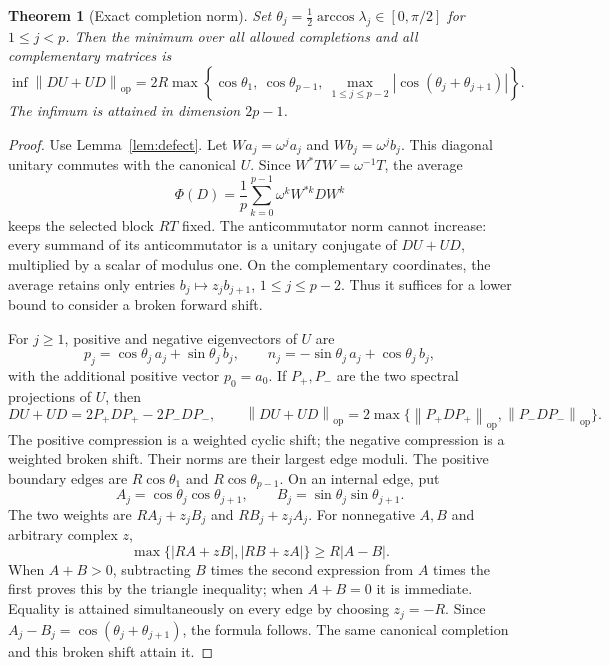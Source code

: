 \documentclass[11pt]{article}
\newtheorem{theorem}{Theorem}[section]
\theoremstyle{remark}
\newcommand{\op}{\mathrm{op}}
\newcommand{\norm}[1]{\left\lVert#1\right\rVert_{\op}}
\begin{document}
\begin{theorem}[Exact completion norm]\label{thm:completion}
Set $\theta_j=\tfrac12\arccos\lambda_j\in[0,\pi/2]$ for $1\le j<p$. Then the minimum over all allowed completions and all complementary matrices is
\begin{equation}\label{eq:completion}
 \boxed{\inf\norm{DU+UD}=2R\max\left\{
 \cos\theta_1,\ \cos\theta_{p-1},\
 \max_{1\le j\le p-2}|\cos(\theta_j+\theta_{j+1})|
 \right\}.}
\end{equation}
The infimum is attained in dimension $2p-1$.
\end{theorem}
\begin{proof}
Use Lemma~\ref{lem:defect}. Let $W a_j=\omega^j a_j$ and $W b_j=\omega^j b_j$. This diagonal unitary commutes with the canonical $U$. Since $W^*TW=\omega^{-1}T$, the average
\[
 \Phi(D)=\frac1p\sum_{k=0}^{p-1}\omega^k W^{*k}DW^k
\]
keeps the selected block $RT$ fixed. The anticommutator norm cannot increase: every summand of its anticommutator is a unitary conjugate of $DU+UD$, multiplied by a scalar of modulus one. On the complementary coordinates, the average retains only entries $b_j\mapsto z_jb_{j+1}$, $1\le j\le p-2$. Thus it suffices for a lower bound to consider a broken forward shift.

For $j\ge1$, positive and negative eigenvectors of $U$ are
\[
 p_j=\cos\theta_j\,a_j+\sin\theta_j\,b_j,\qquad
 n_j=-\sin\theta_j\,a_j+\cos\theta_j\,b_j,
\]
with the additional positive vector $p_0=a_0$. If $P_+,P_-$ are the two spectral projections of $U$, then
\begin{equation}\label{eq:pinching}
 DU+UD=2P_+DP_+-2P_-DP_-,\qquad
 \norm{DU+UD}=2\max\{\norm{P_+DP_+},\norm{P_-DP_-}\}.
\end{equation}
The positive compression is a weighted cyclic shift; the negative compression is a weighted broken shift. Their norms are their largest edge moduli. The positive boundary edges are $R\cos\theta_1$ and $R\cos\theta_{p-1}$. On an internal edge, put
\[
 A_j=\cos\theta_j\cos\theta_{j+1},\qquad
 B_j=\sin\theta_j\sin\theta_{j+1}.
\]
The two weights are $RA_j+z_jB_j$ and $RB_j+z_jA_j$. For nonnegative $A,B$ and arbitrary complex $z$,
\begin{equation}\label{eq:edge}
 \max\{|RA+zB|,|RB+zA|\}\ge R|A-B|.
\end{equation}
When $A+B>0$, subtracting $B$ times the second expression from $A$ times the first proves this by the triangle inequality; when $A+B=0$ it is immediate. Equality is attained simultaneously on every edge by choosing $z_j=-R$. Since $A_j-B_j=\cos(\theta_j+\theta_{j+1})$, the formula follows. The same canonical completion and this broken shift attain it.
\end{proof}
\end{document}

